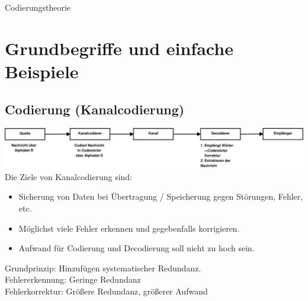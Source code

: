 \setcounter{section}{0}
\newpage
\begin{center}
  \huge{Codierungstheorie}
\end{center}

\section{Grundbegriffe und einfache Beispiele}
	\subsection{Codierung (Kanalcodierung)}
		\includegraphics[width=\textwidth]{eps/pic02.eps}
		Die Ziele von Kanalcodierung sind:
		\begin{itemize}
			\item Sicherung von Daten bei Übertragung / Speicherung gegen Störungen, Fehler, etc.
			\item Möglichst viele Fehler erkennen und gegebenfalls korrigieren.
			\item Aufwand für Codierung und Decodierung soll nicht zu hoch sein.
		\end{itemize}
		Grundprinzip: Hinzufügen systematischer Redundanz.\\
		Fehlererkennung: Geringe Redundanz\\
		Fehlerkorrektur: Größere Redundanz, größerer Aufwand
	
